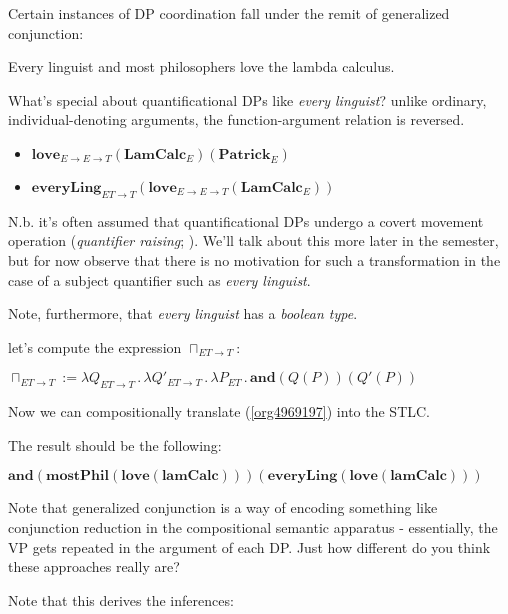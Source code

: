 \documentclass[letterpaper,parskip=half]{scrartcl}
\begin{document}
Certain instances of DP coordination fall under the remit of generalized conjunction:

\begin{exe}
\ex Every linguist and most philosophers love the lambda calculus.
\label{org4969197}
\end{exe}

What's special about quantificational DPs like \emph{every linguist}? unlike ordinary, individual-denoting arguments, the function-argument relation is reversed.

\begin{itemize}
\item \(\mathbf{love}_{E \to E \to T}(\mathbf{LamCalc}_E)(\mathbf{Patrick}_E)\)
\item \(\mathbf{everyLing}_{ET \to T}(\mathbf{love}_{E \to E \to T}(\mathbf{LamCalc}_E))\)
\end{itemize}

N.b. it's often assumed that quantificational DPs undergo a covert movement operation (\emph{quantifier raising}; \autocite{May1977}). We'll talk about this more later in the semester, but for now observe that there is no motivation for such a transformation in the case of a subject quantifier such as \emph{every linguist}.

Note, furthermore, that \emph{every linguist} has a \emph{boolean type}.

let's compute the expression \(\sqcap_{ET \to T}\):

\begin{exe}
\ex \(\sqcap_{ET \to T} := \lambda Q_{ET\to T}\,.\,\lambda Q'_{ET \to T}\,.\,\lambda P_{ET}\,.\,\mathbf{and}(Q(P))(Q'(P))\)
\label{orgc28c45a}
\end{exe}

Now we can compositionally translate (\ref{org4969197}) into the STLC.

The result should be the following:

\begin{exe}
\ex \(\mathbf{and}(\mathbf{mostPhil}(\mathbf{love}(\mathbf{lamCalc})))(\mathbf{everyLing}(\mathbf{love}(\mathbf{lamCalc})))\)
\label{org9f21805}
\end{exe}

Note that generalized conjunction is a way of encoding something like conjunction reduction in the compositional semantic apparatus - essentially, the VP gets repeated in the argument of each DP. Just how different do you think these approaches really are?

Note that this derives the inferences:
\end{document}
